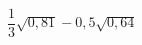 \begin{ex}[type=calculate]
	\begin{condition}
		\( \dfrac{1}{3}\sqrt{0,81}-0,5\sqrt{0,64} \)
	\end{condition}
\end{ex}